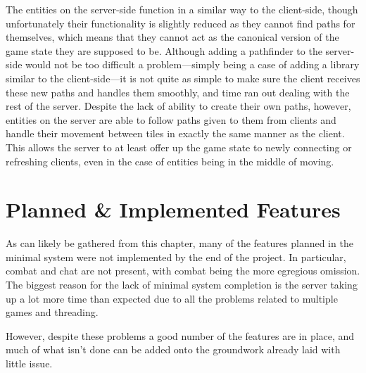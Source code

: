The entities on the server-side function in a similar way to the client-side, though unfortunately their functionality is slightly reduced as they cannot find paths for themselves, which means that they cannot act as the canonical version of the game state they are supposed to be. Although adding a pathfinder to the server-side would not be too difficult a problem---simply being a case of adding a library similar to the client-side---it is not quite as simple to make sure the client receives these new paths and handles them smoothly, and time ran out dealing with the rest of the server. Despite the lack of ability to create their own paths, however, entities on the server are able to follow paths given to them from clients and handle their movement between tiles in exactly the same manner as the client. This allows the server to at least offer up the game state to newly connecting or refreshing clients, even in the case of entities being in the middle of moving.

\section{Planned \& Implemented Features}
As can likely be gathered from this chapter, many of the features planned in the minimal system were not implemented by the end of the project. In particular, combat and chat are not present, with combat being the more egregious omission. The biggest reason for the lack of minimal system completion is the server taking up a lot more time than expected due to all the problems related to multiple games and threading.

However, despite these problems a good number of the features are in place, and much of what isn't done can be added onto the groundwork already laid with little issue.



